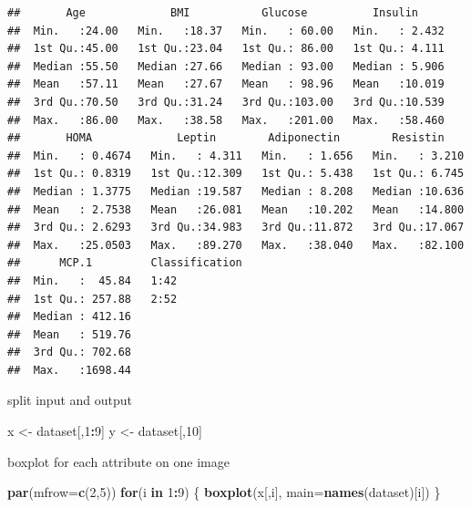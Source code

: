 \documentclass[]{book}
\newenvironment{Shaded}{\begin{snugshade}}{\end{snugshade}}
\newcommand{\ControlFlowTok}[1]{\textcolor[rgb]{0.13,0.29,0.53}{\textbf{#1}}}
\newcommand{\DataTypeTok}[1]{\textcolor[rgb]{0.13,0.29,0.53}{#1}}
\newcommand{\DecValTok}[1]{\textcolor[rgb]{0.00,0.00,0.81}{#1}}
\newcommand{\KeywordTok}[1]{\textcolor[rgb]{0.13,0.29,0.53}{\textbf{#1}}}
\newcommand{\NormalTok}[1]{#1}
\newcommand{\OperatorTok}[1]{\textcolor[rgb]{0.81,0.36,0.00}{\textbf{#1}}}
\newcommand{\StringTok}[1]{\textcolor[rgb]{0.31,0.60,0.02}{#1}}
\begin{document}
\begin{verbatim}
##       Age             BMI           Glucose          Insulin      
##  Min.   :24.00   Min.   :18.37   Min.   : 60.00   Min.   : 2.432  
##  1st Qu.:45.00   1st Qu.:23.04   1st Qu.: 86.00   1st Qu.: 4.111  
##  Median :55.50   Median :27.66   Median : 93.00   Median : 5.906  
##  Mean   :57.11   Mean   :27.67   Mean   : 98.96   Mean   :10.019  
##  3rd Qu.:70.50   3rd Qu.:31.24   3rd Qu.:103.00   3rd Qu.:10.539  
##  Max.   :86.00   Max.   :38.58   Max.   :201.00   Max.   :58.460  
##       HOMA             Leptin        Adiponectin        Resistin     
##  Min.   : 0.4674   Min.   : 4.311   Min.   : 1.656   Min.   : 3.210  
##  1st Qu.: 0.8319   1st Qu.:12.309   1st Qu.: 5.438   1st Qu.: 6.745  
##  Median : 1.3775   Median :19.587   Median : 8.208   Median :10.636  
##  Mean   : 2.7538   Mean   :26.081   Mean   :10.202   Mean   :14.800  
##  3rd Qu.: 2.6293   3rd Qu.:34.983   3rd Qu.:11.872   3rd Qu.:17.067  
##  Max.   :25.0503   Max.   :89.270   Max.   :38.040   Max.   :82.100  
##      MCP.1         Classification
##  Min.   :  45.84   1:42          
##  1st Qu.: 257.88   2:52          
##  Median : 412.16                 
##  Mean   : 519.76                 
##  3rd Qu.: 702.68                 
##  Max.   :1698.44
\end{verbatim}

split input and output

\begin{Shaded}
\begin{Highlighting}[]
\NormalTok{x <-}\StringTok{ }\NormalTok{dataset[,}\DecValTok{1}\OperatorTok{:}\DecValTok{9}\NormalTok{]}
\NormalTok{y <-}\StringTok{ }\NormalTok{dataset[,}\DecValTok{10}\NormalTok{]}
\end{Highlighting}
\end{Shaded}

boxplot for each attribute on one image

\begin{Shaded}
\begin{Highlighting}[]
\KeywordTok{par}\NormalTok{(}\DataTypeTok{mfrow=}\KeywordTok{c}\NormalTok{(}\DecValTok{2}\NormalTok{,}\DecValTok{5}\NormalTok{))}
\ControlFlowTok{for}\NormalTok{(i }\ControlFlowTok{in} \DecValTok{1}\OperatorTok{:}\DecValTok{9}\NormalTok{) \{}
  \KeywordTok{boxplot}\NormalTok{(x[,i], }\DataTypeTok{main=}\KeywordTok{names}\NormalTok{(dataset)[i])}
\NormalTok{\}}
\end{Highlighting}
\end{Shaded}
\end{document}

